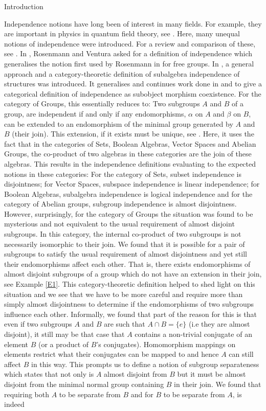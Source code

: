 \documentclass{article}
\begin{document}
	\begin{section}{Introduction}
		
		
		Independence notions have long been of interest in many fields. For example, they are important in physics in quantum field theory, see \cite{S1}. Here, many unequal notions of independence were introduced.  For a review and comparison of these, see \cite{S2}.  In \cite{MainC},  Rosenmann and  Ventura asked for a definition of independence which generalises the notion  first used by Rosenmann in \cite{MainC2} for free groups.  In \cite{Z1}, a general approach and a category-theoretic definition of subalgebra independence of structures was introduced. It generalises and continues work done in \cite{M1} and \cite{Z2} to give a categorical definition of independence as subobject morphism coexistence.  For the category of  Groups, this essentially reduces to: Two subgroups $A$ and $B$ of a group, are independent if and only if  any endomorphisms, $\alpha$ on $A$ and $\beta$ on $B$, can be extended to an endomorphism of the minimal group generated by $A$ and $B$ (their join). This extension, if it exists must be unique, see \cite{Z1}. Here, it uses the fact that in the categories of Sets, Boolean Algebras, Vector Spaces and Abelian Groups, the co-product of two algebras in these categories are the join of these algebras. This results in the independence definitions evaluating to the expected notions in these categories: For the category of  Sets, subset independence is disjointness; for Vector Spaces, subspace independence  is linear independence; for Boolean Algebras, subalgebra independence is logical independence and for the category of Abelian groups, subgroup independence is almost disjointness. However, surprisingly, for the category of Groups the situation was found to be mysterious and not equivalent to the usual requirement of almost disjoint subgroups. In this category, the internal co-product of two subgroups is not necessarily isomorphic to their join.  We found that it is possible for a pair of subgroups to satisfy the usual requirement of almost disjointness and yet still their endomorphisms affect each other. That is, there exists endomorphisms of almost disjoint subgroups of a group which do not have an extension in their join, see Example \ref{E1}. This category-theoretic definition helped to shed light on this situation and we see that we have to  be more careful and require more than simply almost disjointness to determine if the endomorphisms of two subgroups influence each other. Informally, we found that part of the reason for this is that even if  two subgroups $A$ and $B$ are such that $A \cap B = \{e\}$ (i.e they are almost disjoint), it still may be that case that $A$ contains a non-trivial conjugate of an element $B$ (or a product of $B$'s conjugates). Homomorphism mappings on elements restrict what their conjugates can be mapped to and hence $A$ can still affect $B$ in this way. This prompts us to define a notion of subgroup separateness which states that not only is $A$ almost disjoint from $B$ but it must be almost disjoint from the minimal normal group containing $B$ in their join. We found that requiring both $A$ to be separate from $B$  and  for $B$ to be separate from $A$, is indeed 
\end{section}
\end{document}
